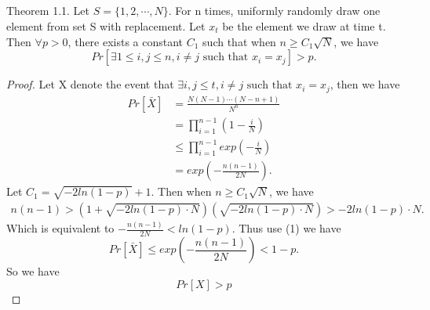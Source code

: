 \documentclass{article}
\begin{document}
\begin{spacing}{1.1}
    \subsection{}
    Theorem 1.1. Let $S = \{1, 2, \cdots, N\}$. For n times, uniformly randomly draw one element from set S with replacement. Let $x_t$ be the element we draw at time t. Then $\forall p > 0$, there exists a constant $C_1$ such that when $n \geq C_1 \sqrt{N}$, we have
    $$Pr[\exists 1\leq i, j \leq n, i\not = j \text{ such that } x_i = x_j] > p.$$
    \begin{proof}
        Let X denote the event that $\exists i, j \leq t, i\not = j \text{ such that } x_i = x_j$, then we have
        \begin{equation}
            \begin{aligned}
                Pr[\bar{X}] &= \frac{N(N-1)\cdots (N-n+1)}{N^n}\\
                &= \prod_{i=1}^{n-1}(1 - \frac{i}{N})\\
                &\leq \prod_{i=1}^{n-1} exp(-\frac{i}{N})\\
                &= exp(-\frac{n(n-1)}{2N}).
            \end{aligned}
        \end{equation}
        Let $C_1 = \sqrt{-2ln(1 - p)} + 1$. Then when $n \geq C_1\sqrt{N}$, we have
        \begin{equation}
            \begin{aligned}
                n(n-1) > (1 + \sqrt{-2ln(1 - p)\cdot N})(\sqrt{-2ln(1 - p)\cdot N}) > -2ln(1-p)\cdot N.
            \end{aligned}
        \end{equation}
        Which is equivalent to $-\frac{n(n-1)}{2N} < ln(1 - p)$.
        Thus use (1) we have
        $$Pr[\bar{X}] \leq exp(-\frac{n(n-1)}{2N}) < 1 - p.$$
        So we have
        $$Pr[X] > p$$
    \end{proof}

\end{spacing}
\end{document}
